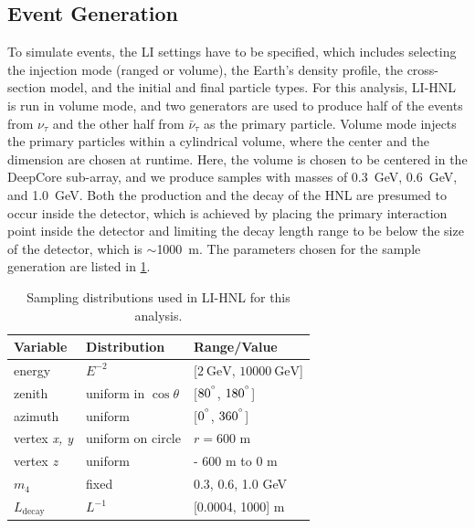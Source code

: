 \documentclass[
    aps,
    prd,
    reprint,
    amsmath,
    amssymb,
    nofootinbib,
    linenumbers,
    superscriptaddress,
    floatfix
]{revtex4-2}
\newcommand{\gev}{\giga\electronvolt}
\begin{document}
\subsection{Event Generation}

To simulate events, the LI settings have to be specified, which includes selecting the injection mode (ranged or volume), the Earth's density profile, the cross-section model, and the initial and final particle types.
For this analysis, LI-HNL is run in volume mode, and two generators are used to produce half of the events from $\nu_\tau$ and the other half from $\bar{\nu}_\tau$ as the primary particle. Volume mode injects the primary particles within a cylindrical volume, where the center and the dimension are chosen at runtime. Here, the volume is chosen to be centered in the DeepCore sub-array, and we produce samples with masses of \SI{0.3}{\gev}, \SI{0.6}{\gev}, and \SI{1.0}{\gev}.
Both the production and the decay of the HNL are presumed to occur inside the detector, which is achieved by placing the primary interaction point inside the detector and limiting the decay length range to be below the size of the detector, which is $\sim$\SI{1000}{\meter}. The parameters chosen for the sample generation are listed in \cref{tab:sampling_dists}. 

\begin{table}[h]
    \small
    \begin{tabular}{ lll }
    \hline\hline    
    \textbf{Variable} & \textbf{Distribution} & \textbf{Range/Value} \\     
    \hline\hline    
    energy & $E^{-2}$  & [$\SI{2}{\gev}$, $\SI{10000}{\gev}$] \\
    zenith & uniform in $\cos{\theta}$ & [$80^{\degree}$, $180^{\degree}$] \\
    azimuth& uniform & [$0^{\degree}$, $360^{\degree}$] \\
    vertex \textit{x, y}& uniform on circle & $r=600$ m \\
    vertex \textit{z} & uniform  & - 600 m  to 0 m \\
    $m_4$& fixed & {0.3, 0.6, 1.0} GeV \\
    $L_{\textrm{decay}}$ & $L^{-1}$ & [0.0004, 1000] m \\
    \hline
\end{tabular}
\internallinenumbers
\caption{Sampling distributions used in LI-HNL for this analysis.}
\label{tab:sampling_dists}
\end{table}
\end{document}
